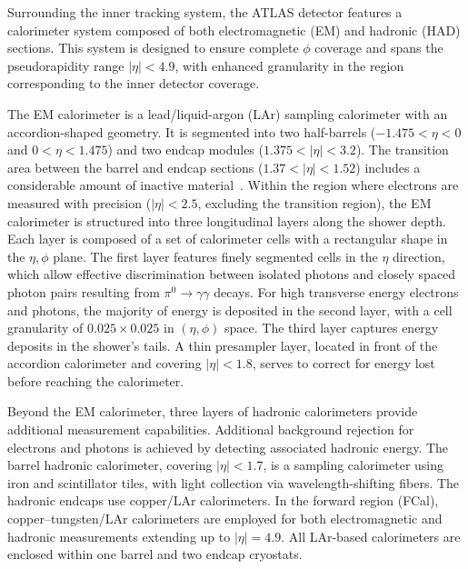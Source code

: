 Surrounding the inner tracking system, the ATLAS detector features a calorimeter system composed of both electromagnetic (EM) and hadronic (HAD) sections. 
This system is designed to ensure complete $\phi$ coverage and spans the pseudorapidity range $|\eta|<4.9$, with enhanced granularity in the region corresponding to the inner detector coverage. 

The EM calorimeter is a lead/liquid-argon (LAr) sampling calorimeter with an accordion-shaped geometry.
It is segmented into two half-barrels ($-1.475<\eta<0$ and $0<\eta<1.475$) and two endcap modules ($1.375<|\eta|<3.2$).
The transition area between the barrel and endcap sections ($1.37<|\eta|<1.52$) includes a considerable amount of inactive material~\cite{PERF-2007-01}.
Within the region where electrons are measured with precision ($|\eta|<2.5$, excluding the transition region),
the EM calorimeter is structured into three longitudinal layers along the shower depth. Each layer is composed of a set of calorimeter cells with a rectangular shape in the $\eta, \phi$ plane. 
The first layer features finely segmented cells in the $\eta$ direction,
which allow effective discrimination between isolated photons and closely spaced photon pairs resulting from $\pi^{0}\rightarrow \gamma\gamma$ decays.
For high transverse energy electrons and photons, the majority of energy is deposited in the second layer,
with a cell granularity of $0.025\times 0.025$ in $(\eta, \phi)$ space.
The third layer captures energy deposits in the shower's tails.
A thin presampler layer, located in front of the accordion calorimeter and covering $|\eta|<1.8$,
serves to correct for energy lost before reaching the calorimeter.
 
Beyond the EM calorimeter, three layers of hadronic calorimeters provide additional measurement capabilities.
Additional background rejection for electrons and photons is achieved by detecting associated hadronic energy.
The barrel hadronic calorimeter, covering $|\eta| < 1.7$, is a sampling calorimeter using iron and scintillator tiles,
with light collection via wavelength-shifting fibers. The hadronic endcaps use copper/LAr calorimeters.
In the forward region (FCal), copper–tungsten/LAr calorimeters are employed for both electromagnetic and hadronic measurements
extending up to $|\eta| = 4.9$. All LAr-based calorimeters are enclosed within one barrel and two endcap cryostats.


